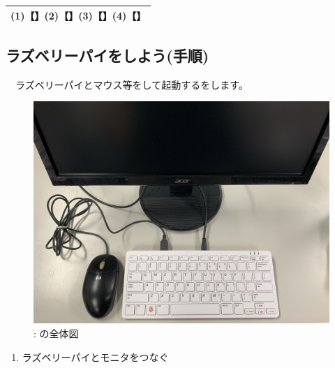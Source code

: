 \documentclass[a4paper,12pt]{jarticle}
\begin{document}
\begin{enumerate}
\begin{itemize}
\begin{table}[htbp]
                                \centering
                              \begin{tabular}{|c|}
                                \hline
                                    (1)【\hspace{3pc}】(2)【\hspace{3pc}】(3)【\hspace{3pc}】(4)【\hspace{3pc}】\\
                                    \hline
                                \end{tabular}
                                \end{table}
          \end{itemize}



          \clearpage
\subsection{ラズベリーパイをしよう(手順)}
\ \ ラズベリーパイとマウス等をして起動するをします。

\begin{figure}[ht]
  \centering
  \begin{minipage}{0.5\textwidth}
    {\upshape
      \includegraphics[width=0.8\linewidth]{connections01-2023.jpg}
      \newline
      : の全体図}

  \end{minipage}
\end{figure}

\begin{enumerate}
  \item ラズベリーパイとモニタをつなぐ


\end{enumerate}
\end{enumerate}
\end{document}
